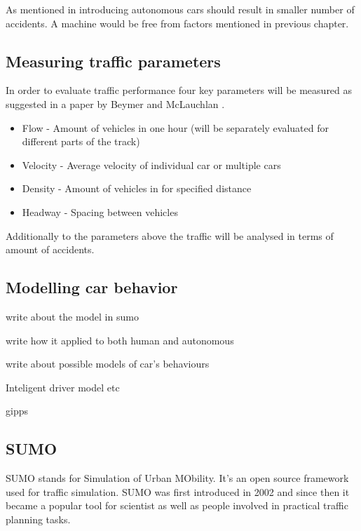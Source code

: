 \documentclass[11pt]{article}
\begin{document}
As mentioned in %
introducing autonomous cars should result in smaller number of accidents. A machine would be free from factors mentioned in previous chapter. 






\subsection{Measuring traffic parameters}

In order to evaluate traffic performance four key parameters will be measured as suggested in a paper by Beymer and McLauchlan \citep{beymer1997real}. 

\begin{itemize}
  \item Flow - Amount of vehicles in one hour (will be separately evaluated for different parts of the track)
  \item Velocity - Average velocity of individual car or multiple cars
  \item Density - Amount of vehicles in for specified distance
  \item Headway - Spacing between vehicles
\end{itemize}

Additionally to the parameters above the traffic will be analysed in terms of amount of accidents.



\subsection{Modelling car behavior}

write about the model in sumo

write how it applied to both human and autonomous

write about possible models of car's behaviours

Inteligent driver model etc

gipps

\subsection{SUMO}

SUMO stands for Simulation of Urban MObility. It's an open source framework used for traffic simulation\citep{krajzewicz2002sumo}. SUMO was first introduced in 2002 and since then it became a popular tool for scientist as well as people involved in practical traffic planning tasks. 
\end{document}
